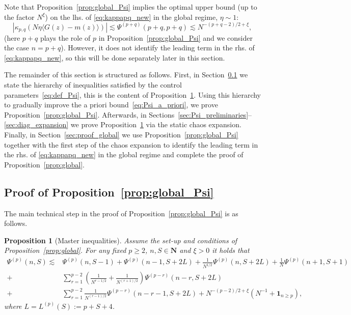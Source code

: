 \documentclass[10pt]{amsart}
\newtheorem{proposition}[theorem]{Proposition}
\numberwithin{equation}{section}
\newcommand{\N}{\mathbf{N}}
\begin{document}
Note that Proposition~\ref{prop:global_Psi}  implies the optimal upper bound (up to the factor $N^\xi$) on the lhs. of \eqref{eq:kappapq_new} in the global regime, $\eta\sim 1$:
\begin{equation}
\left\vert\kappa_{p,q}\left(N\eta\langle G(z)-m(z)\rangle\right) \right\vert \lesssim \Psi^{(p+q)}(p+q,p+q) \lesssim N^{-(p+q-2)/2+\xi},
\end{equation}
(here $p+q$ plays the role of $p$ in  Proposition~\ref{prop:global_Psi} and we consider the case $n=p+q$). However, it does not identify the leading term in the rhs. of \eqref{eq:kappapq_new}, so this will be done separately later in this section.


The remainder of this section is structured as follows. First, in Section~\ref{sec:proof_global_Psi} we state the hierarchy of inequalities satisfied by the control parameters~\eqref{eq:def_Psi}, this is the content of Proposition~\ref{prop:global_master}. Using this hierarchy to gradually improve the a priori bound~\eqref{eq:Psi_a_priori}, we prove Proposition~\ref{prop:global_Psi}. Afterwards, in Sections~\ref{sec:Psi_preliminaries}--\ref{sec:diag_expansion} we prove Proposition~\ref{prop:global_master} via the static chaos expansion. Finally, in Section~\ref{sec:proof_global} we use Proposition~\ref{prop:global_Psi} together with the first step of the chaos expansion to identify the leading term in the rhs. of \eqref{eq:kappapq_new} in the global regime and complete the proof of Proposition~\ref{prop:global}.


\subsection{Proof of Proposition~\ref{prop:global_Psi}}\label{sec:proof_global_Psi}

The main technical step in the proof of Proposition~\ref{prop:global_Psi} is as follows.

\begin{proposition}[Master inequalities]\label{prop:global_master} Assume the set-up and conditions of Proposition~\ref{prop:global}. For any fixed $p\ge 2$, $n,S\in\N$ and $\xi> 0$ it holds that
\begin{equation}
\begin{split}
\Psi^{(p)}(n,S)\lesssim &\Psi^{(p)}(n,S-1) + \Psi^{(p)}(n-1,S+2L)+\frac{1}{N^{1/2}}\Psi^{(p)}(n,S+2L)+ \frac{1}{N}\Psi^{(p)}(n+1,S+1)\\
+&\sum_{r=1}^{p-2}\left(\frac{1}{N^{r-1/2}}+\frac{1}{N^{(r+1)/2}}\right)\Psi^{(p-r)}(n-r,S+2L)\\
+&\sum_{r=1}^{p-2} \frac{1}{N^{(r-1)/2}} \Psi^{(p-r)}(n-r-1,S+2L) + N^{-(p-2)/2+\xi} \left( N^{-1} + \bm{1}_{n\ge p}\right),
\end{split}
\label{eq:global_master}
\end{equation}
where $L=L^{(p)}(S):=p+S+4$.
\end{proposition}
\end{document}
